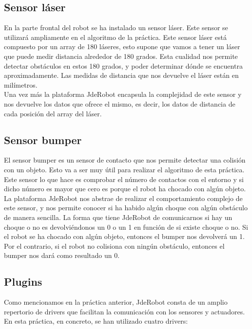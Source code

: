 \subsection{Sensor láser}
En la parte frontal del robot se ha instalado un sensor láser. Este sensor se utilizará ampliamente en el algoritmo de la práctica. Este sensor láser está compuesto por un array de 180 láseres, esto supone que vamos a tener un láser que puede medir distancia alrededor de 180 grados. Esta cualidad nos permite detectar obstáculos en estos 180 grados, y poder determinar dónde se encuentra aproximadamente. Las medidas de distancia que nos devuelve el láser están en milímetros.\\

Una vez más la plataforma JdeRobot encapsula la complejidad de este sensor y nos devuelve los datos que ofrece el mismo, es decir, los datos de distancia de cada posición del array del láser. \\

\subsection{Sensor bumper}
El sensor bumper es un sensor de contacto que nos permite detectar una colisión con un objeto. Esto va a ser muy útil para realizar el algoritmo de esta práctica. Este sensor lo que hace es comprobar el número de contactos con el entorno y si dicho número es mayor que cero es porque el robot ha chocado con algún objeto. La plataforma JdeRobot nos abstrae de realizar el comportamiento complejo de este sensor, y nos permite conocer si ha habido algún choque con algún obstáculo de manera sencilla. La forma que tiene JdeRobot de comunicarnos si hay un choque o no es devolviéndonos un 0 o un 1 en función de si existe choque o no. Si el robot se ha chocado con algún objeto, entonces el bumper nos devolverá un 1. Por el contrario, si el robot no colisiona con ningún obstáculo, entonces el bumper nos dará como resultado un 0.\\

\subsection{Plugins}
Como mencionamos en la práctica anterior, JdeRobot consta de un amplio repertorio de drivers que facilitan la comunicación con los sensores y actuadores. En esta práctica, en concreto, se han utilizado cuatro drivers: 

